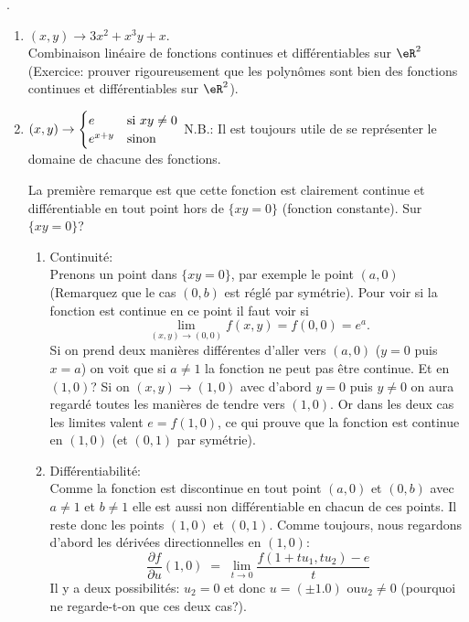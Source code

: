 .
\begin{enumerate}
\item $(x,y)\rightarrow  3x^2+x^3y+x$.\\
Combinaison linéaire de fonctions continues et différentiables sur $\eR^2$ (Exercice: prouver rigoureusement que les polynômes sont bien des fonctions continues et différentiables sur $\eR^2$).


\item \(  (x,y)\rightarrow\begin{cases}
        e    &   \text{si $ xy\neq 0$}\\
        e^{x+y}    &    \text{sinon}
    \end{cases}\)
N.B.: Il est toujours utile de se représenter le domaine de chacune des fonctions.

\noindent La première remarque est que cette fonction est clairement continue et différentiable en tout point hors de $\{xy=0\}$ (fonction constante). Sur $\{xy=0\}$?
\begin{enumerate}
\item Continuité:\\
Prenons un point dans $\{xy=0\}$, par exemple le point $(a,0)$ (Remarquez que le cas $(0,b)$ est réglé par symétrie). Pour voir si la fonction est continue en ce point il faut voir si \[\lim_{(x,y)\rightarrow (0,0)}f(x,y)=f(0,0)=e^a.\] Si on prend deux manières différentes d'aller vers $(a,0)$ ($y=0$ puis $x=a$) on voit que si $a \neq1$ la fonction ne peut pas être continue. Et en $(1,0)$? Si on $(x,y)\rightarrow (1,0)$ avec d'abord $y=0$ puis $y\neq0$ on aura regardé toutes les manières de tendre vers $(1,0)$. Or dans les deux cas les limites valent $e = f(1,0)$, ce qui prouve que la fonction est continue en $(1,0)$ (et $(0,1)$ par symétrie).

\item Différentiabilité:\\
Comme la fonction est discontinue en tout point $(a,0)$ et $(0,b)$ avec $a\neq1$ et $b\neq1$ elle est aussi non différentiable en chacun de ces points. Il reste donc les points $(1,0)$ et $(0,1)$. Comme toujours, nous regardons d'abord les dérivées directionnelles en $(1,0)$:
\[\frac{ \partial f }{ \partial u }(1,0) \;=\;\lim_{t\rightarrow 0}\frac{f(1+tu_1,tu_2)-e}{t}\]
Il y a deux possibilités: $u_2=0$ et donc $u=(\pm1.0)$ ou$u_2\neq0$ (pourquoi ne regarde-t-on que ces deux cas?).


\end{enumerate}
\end{enumerate}
